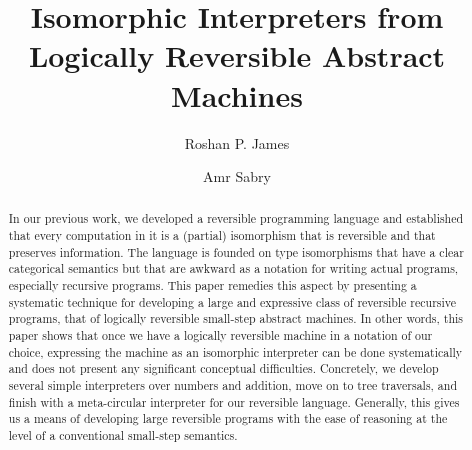 \documentclass{llncs}
\begin{document}
\title{Isomorphic Interpreters from Logically Reversible Abstract Machines} 
\author{Roshan P. James \and Amr Sabry}
\maketitle

\begin{abstract}
  In our previous work, we developed a reversible programming language and
  established that every computation in it is a (partial) isomorphism that is
  reversible and that preserves information. The language is founded on type
  isomorphisms that have a clear categorical semantics but that are awkward
  as a notation for writing actual programs, especially recursive
  programs. This paper remedies this aspect by presenting a systematic
  technique for developing a large and expressive class of reversible
  recursive programs, that of logically reversible small-step abstract
  machines. In other words, this paper shows that once we have a logically
  reversible machine in a notation of our choice, expressing the machine as
  an isomorphic interpreter can be done systematically and does not present
  any significant conceptual difficulties. Concretely, we develop several
  simple interpreters over numbers and addition, move on to tree traversals,
  and finish with a meta-circular interpreter for our reversible
  language. Generally, this gives us a means of developing large reversible
  programs with the ease of reasoning at the level of a conventional
  small-step semantics.
\end{abstract}
\end{document}
